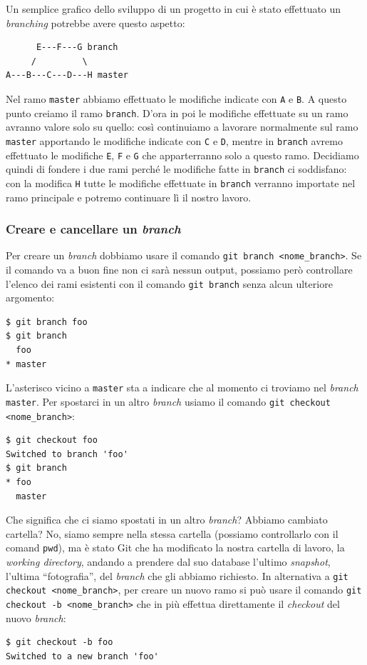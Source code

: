 \documentclass[a4paper,12pt,oneside]{article}
\begin{document}
Un semplice grafico dello sviluppo di un progetto in cui è stato effettuato un
\emph{branching} potrebbe avere questo aspetto:
\begin{lstlisting}
      E---F---G branch
     /         \
A---B---C---D---H master
\end{lstlisting}
Nel ramo \lstinline|master| abbiamo effettuato le modifiche indicate con
\lstinline|A| e \lstinline|B|. A questo punto creiamo il ramo
\lstinline|branch|. D'ora in poi le modifiche effettuate su un ramo avranno
valore solo su quello: così continuiamo a lavorare normalmente sul ramo
\lstinline|master| apportando le modifiche indicate con \lstinline|C| e
\lstinline|D|, mentre in \lstinline|branch| avremo effettuato le modifiche
\lstinline|E|, \lstinline|F| e \lstinline|G| che apparterranno solo a questo ramo.
Decidiamo quindi di fondere i due rami perché le modifiche fatte in
\lstinline|branch| ci soddisfano: con la modifica \lstinline|H| tutte le modifiche
effettuate in \lstinline|branch| verranno importate nel ramo principale e potremo
continuare lì il nostro lavoro.

\subsubsection{Creare e cancellare un \emph{branch}}
Per creare un \emph{branch} dobbiamo usare il comando
\lstinline|git branch <nome_branch>|. Se il comando va a buon fine non ci sarà
nessun output, possiamo però controllare l'elenco dei rami esistenti con il comando
\lstinline|git branch| senza alcun ulteriore argomento:
\begin{lstlisting}
$ git branch foo
$ git branch
  foo
* master
\end{lstlisting}
L'asterisco vicino a \lstinline|master| sta a indicare che al momento ci troviamo
nel \emph{branch} \lstinline|master|. Per spostarci in un altro \emph{branch}
usiamo il comando \lstinline|git checkout <nome_branch>|:
\begin{lstlisting}
$ git checkout foo
Switched to branch 'foo'
$ git branch
* foo
  master
\end{lstlisting}
Che significa che ci siamo spostati in un altro \emph{branch}? Abbiamo cambiato
cartella? No, siamo sempre nella stessa cartella (possiamo controllarlo con il
comand \lstinline|pwd|), ma è stato Git che ha modificato la nostra cartella di
lavoro, la \emph{working directory}, andando a prendere dal suo database l'ultimo
\emph{snapshot}, l'ultima ``fotografia'', del \emph{branch} che gli abbiamo
richiesto. In alternativa a \lstinline|git checkout <nome_branch>|, per creare
un nuovo ramo si può usare il comando \lstinline|git checkout -b <nome_branch>|
che in più effettua direttamente il \emph{checkout} del nuovo \emph{branch}:
\begin{lstlisting}
$ git checkout -b foo
Switched to a new branch 'foo'
\end{lstlisting}
\end{document}
